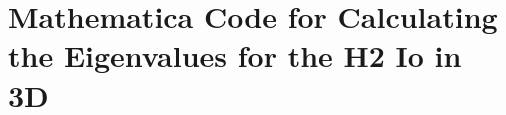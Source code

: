 \chapter{Mathematica Code for Calculating the Eigenvalues for the H2 Io in 3D}
\label{AppendixB}




